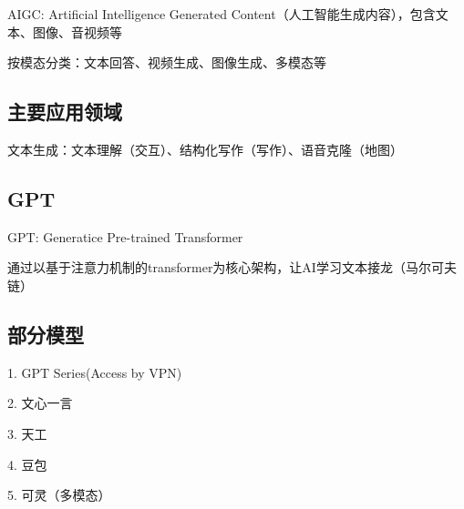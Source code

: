 
{}
\begin{defi}
    AIGC: Artificial Intelligence Generated Content（人工智能生成内容），包含文本、图像、音视频等
\end{defi}
按模态分类：文本回答、视频生成、图像生成、多模态等
\subsection*{主要应用领域}%
\label{sub:主要应用领域}
\begin{eg}
    文本生成：文本理解（交互）、结构化写作（写作）、语音克隆（地图）
\end{eg}
\subsection*{GPT}%
\label{sub:GPT}
\begin{defi}
    GPT: Generatice Pre-trained Transformer

    通过以基于注意力机制的transformer为核心架构，让AI学习文本接龙（马尔可夫链）
\end{defi}
\subsection*{部分模型}%
\label{sub:部分模型}
1. GPT Series(Access by VPN)

2. 文心一言

3. 天工

4. 豆包

5. 可灵（多模态）
